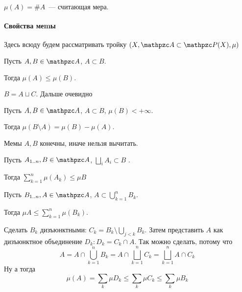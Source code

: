 \documentclass[draft, timbord]{longnotes}
\begin{document}
\begin{exmp}\label{exmp:meas::meas::cnt}
  $\mu(A) = \# A$~--- считающая мера. 
\end{exmp}

\paragraph{Свойства меmы}

Здесь всюду будем рассматривать тройку $(X, \alg \subset \pset (X), \mu)$

\begin{prop}\label{prop:meas::meas::monot}
  Пусть $A,B \in \alg$, $A \subset B$. \par Тогда $\mu(A) \leqslant \mu(B)$.
\end{prop}
\begin{lproof}
  $B = A \sqcup C$. Дальше очевидно
\end{lproof}
\begin{prop}\label{prop:meas::meas::diff}
  Пусть $A,B \in \alg$, $A \subset B$, $\mu(B) < +\infty$.  \par 
  Тогда $ \mu(B\setminus A) = \mu(B) - \mu(A)$.
\end{prop}
Мемы $A,B$ конечны, иначе нельзя вычитать.
\begin{prop}\label{prop:meas::meas::enfmont}
  Пусть $A_{1 \intrng n}, B \in \alg$, $\bigsqcup_i A_i \subset B$ . \par
  Тогда $\displaystyle\sum_{k=1}^n \mu(A_k) \leqslant \mu B$
\end{prop}

\begin{prop}\label{prop:meas::meas::semiadd}
  Пусть $B_{1 \intrng n}, A \in \alg$, $A \subset \displaystyle \bigcup_{k=1}^n B_k$. \par
  Тогда $\displaystyle\mu A \leqslant \sum_{k=1}^n \mu(B_k)$.
\end{prop}
\begin{lproof}
  Сделать $B_k$ дизъюнктными: $C_k = B_k \setminus \bigcup_{j <k} B_k$. Затем представить $A$ как
  дизъюнктное объединение $D_k \colon D_k = C_k \cap A$. Так можно сделать, потому что
  \[
    A = A \cap \bigcup_{k=1}^n B_k = A \cap \bigsqcup_{k=1}^n C_k = \bigsqcup_{k=1}^n A \cap C_k
  \]
  Ну а тогда
  \[
    \mu (A) = \sum_k \mu D_k \leqslant \sum_k \mu C_k \leqslant \sum_k \mu B_k
  \]
\end{lproof}
\end{document}
